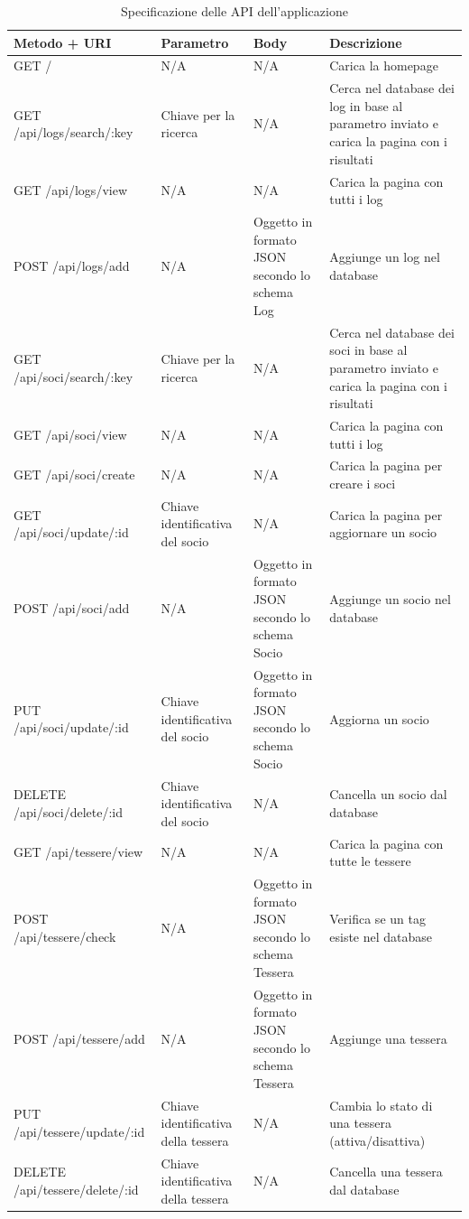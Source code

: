 \documentclass[12pt]{report}
\begin{document}
\begin{table}[H]
	\scriptsize
	\centering
	\renewcommand\arraystretch{1.8}
	\renewcommand\tabcolsep{3.0pt}
	\begin{tabularx}{\textwidth}{|L|L|L|L|}
		\hline
		\textbf{Metodo + URI} & \textbf{Parametro} & \textbf{Body} & \textbf{Descrizione} \\
		\hline                              
		GET / & N/A & N/A & Carica la homepage \\ 
		\hline
		GET /api/logs/search/:key & Chiave per la ricerca & N/A 
		& Cerca nel database dei log in base al parametro inviato e carica la pagina con i risultati \\
		\hline
		GET /api/logs/view & N/A & N/A & Carica la pagina con tutti i log \\
		\hline  
		POST /api/logs/add & N/A & Oggetto in formato JSON secondo lo schema Log & Aggiunge un log nel database \\
		\hline
		GET /api/soci/search/:key & Chiave per la ricerca & N/A & Cerca nel database dei soci in base al parametro inviato e carica la pagina con i risultati \\ 
		\hline
		GET /api/soci/view & N/A & N/A & Carica la pagina con tutti i log \\ 
		\hline
		GET /api/soci/create & N/A & N/A & Carica la pagina per creare i soci \\ 
		\hline
		GET /api/soci/update/:id & Chiave identificativa del socio & N/A & Carica la pagina per aggiornare un socio \\ 
		\hline
		POST /api/soci/add & N/A & Oggetto in formato JSON secondo lo schema Socio & Aggiunge un socio nel database \\ 
		\hline
		PUT /api/soci/update/:id & Chiave identificativa del socio & Oggetto in formato JSON secondo lo schema Socio & Aggiorna un socio \\ 
		\hline
		DELETE /api/soci/delete/:id & Chiave identificativa del socio & N/A & Cancella un socio dal database \\ 
		\hline
		GET /api/tessere/view & N/A & N/A & Carica la pagina con tutte le tessere \\ 
		\hline
		POST /api/tessere/check & N/A & Oggetto in formato JSON secondo lo schema Tessera & Verifica se un tag esiste nel database \\
		\hline
		POST /api/tessere/add & N/A & Oggetto in formato JSON secondo lo schema Tessera & Aggiunge una tessera \\ 
		\hline
		PUT /api/tessere/update/:id & Chiave identificativa della tessera & N/A & Cambia lo stato di una tessera (attiva/disattiva) \\ 
		\hline
		DELETE /api/tessere/delete/:id & Chiave identificativa della tessera & N/A & Cancella una tessera dal database \\ 
		\hline
	\end{tabularx}
	\caption{Specificazione delle API dell'applicazione}
	\label{tab:api}
\end{table}    
\end{document}

